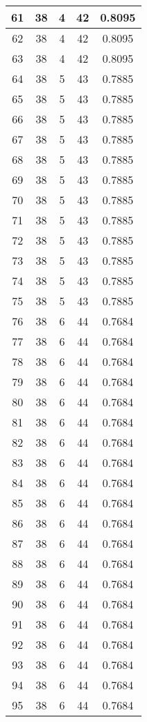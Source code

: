 \documentclass[letterpaper, 12pt]{article}
\begin{document}
\begin{longtable}{|c|c|c|c|c|}
61 & 38 & 4 & 42 & 0.8095 \\
\hline
62 & 38 & 4 & 42 & 0.8095 \\
\hline
63 & 38 & 4 & 42 & 0.8095 \\
\hline
64 & 38 & 5 & 43 & 0.7885 \\
\hline
65 & 38 & 5 & 43 & 0.7885 \\
\hline
66 & 38 & 5 & 43 & 0.7885 \\
\hline
67 & 38 & 5 & 43 & 0.7885 \\
\hline
68 & 38 & 5 & 43 & 0.7885 \\
\hline
69 & 38 & 5 & 43 & 0.7885 \\
\hline
70 & 38 & 5 & 43 & 0.7885 \\
\hline
71 & 38 & 5 & 43 & 0.7885 \\
\hline
72 & 38 & 5 & 43 & 0.7885 \\
\hline
73 & 38 & 5 & 43 & 0.7885 \\
\hline
74 & 38 & 5 & 43 & 0.7885 \\
\hline
75 & 38 & 5 & 43 & 0.7885 \\
\hline
76 & 38 & 6 & 44 & 0.7684 \\
\hline
77 & 38 & 6 & 44 & 0.7684 \\
\hline
78 & 38 & 6 & 44 & 0.7684 \\
\hline
79 & 38 & 6 & 44 & 0.7684 \\
\hline
80 & 38 & 6 & 44 & 0.7684 \\
\hline
81 & 38 & 6 & 44 & 0.7684 \\
\hline
82 & 38 & 6 & 44 & 0.7684 \\
\hline
83 & 38 & 6 & 44 & 0.7684 \\
\hline
84 & 38 & 6 & 44 & 0.7684 \\
\hline
85 & 38 & 6 & 44 & 0.7684 \\
\hline
86 & 38 & 6 & 44 & 0.7684 \\
\hline
87 & 38 & 6 & 44 & 0.7684 \\
\hline
88 & 38 & 6 & 44 & 0.7684 \\
\hline
89 & 38 & 6 & 44 & 0.7684 \\
\hline
90 & 38 & 6 & 44 & 0.7684 \\
\hline
91 & 38 & 6 & 44 & 0.7684 \\
\hline
92 & 38 & 6 & 44 & 0.7684 \\
\hline
93 & 38 & 6 & 44 & 0.7684 \\
\hline
94 & 38 & 6 & 44 & 0.7684 \\
\hline
95 & 38 & 6 & 44 & 0.7684 \\

\end{longtable}
\end{document}
